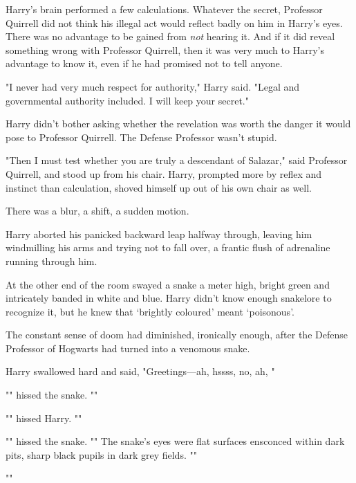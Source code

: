 Harry's brain performed a few calculations. Whatever the secret, Professor
Quirrell did not think his illegal act would reflect badly on him in Harry's
eyes. There was no advantage to be gained from \emph{not} hearing it. And if it
did reveal something wrong with Professor Quirrell, then it was very much to
Harry's advantage to know it, even if he had promised not to tell anyone.

"I never had very much respect for authority," Harry said. "Legal and
governmental authority included. I will keep your secret."

Harry didn't bother asking whether the revelation was worth the danger it would
pose to Professor Quirrell. The Defense Professor wasn't stupid.

"Then I must test whether you are truly a descendant of Salazar," said
Professor Quirrell, and stood up from his chair. Harry, prompted more by reflex
and instinct than calculation, shoved himself up out of his own chair as well.

There was a blur, a shift, a sudden motion.

Harry aborted his panicked backward leap halfway through, leaving him
windmilling his arms and trying not to fall over, a frantic flush of adrenaline
running through him.

At the other end of the room swayed a snake a meter high, bright green and
intricately banded in white and blue. Harry didn't know enough snakelore to
recognize it, but he knew that `brightly coloured' meant `poisonous'.

The constant sense of doom had diminished, ironically enough, after the Defense
Professor of Hogwarts had turned into a venomous snake.

Harry swallowed hard and said, "Greetings---ah, hssss, no, ah,
"

"" hissed the snake. ""

"" hissed Harry. ""

"" hissed the snake. "" The snake's eyes were flat surfaces ensconced within dark pits, sharp
black pupils in dark grey fields. ""

""

